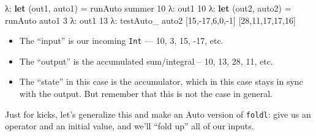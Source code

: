 \documentclass[]{article}
\newenvironment{Shaded}{}{}
\newcommand{\KeywordTok}[1]{\textcolor[rgb]{0.00,0.44,0.13}{\textbf{{#1}}}}
\newcommand{\DataTypeTok}[1]{\textcolor[rgb]{0.56,0.13,0.00}{{#1}}}
\newcommand{\DecValTok}[1]{\textcolor[rgb]{0.25,0.63,0.44}{{#1}}}
\newcommand{\OtherTok}[1]{\textcolor[rgb]{0.00,0.44,0.13}{{#1}}}
\newcommand{\FunctionTok}[1]{\textcolor[rgb]{0.02,0.16,0.49}{{#1}}}
\newcommand{\NormalTok}[1]{{#1}}
\begin{document}
\begin{Shaded}
\end{Shaded}

\begin{Shaded}
\begin{Highlighting}[]
\NormalTok{λ}\FunctionTok{:} \KeywordTok{let} \NormalTok{(out1, auto1) }\FunctionTok{=} \NormalTok{runAuto summer }\DecValTok{10}
\NormalTok{λ}\FunctionTok{:} \NormalTok{out1}
\DecValTok{10}
\NormalTok{λ}\FunctionTok{:} \KeywordTok{let} \NormalTok{(out2, auto2) }\FunctionTok{=} \NormalTok{runAuto auto1 }\DecValTok{3}
\NormalTok{λ}\FunctionTok{:} \NormalTok{out1}
\DecValTok{13}
\NormalTok{λ}\FunctionTok{:} \NormalTok{testAuto_ auto2 [}\DecValTok{15}\NormalTok{,}\FunctionTok{-}\DecValTok{17}\NormalTok{,}\DecValTok{6}\NormalTok{,}\DecValTok{0}\NormalTok{,}\FunctionTok{-}\DecValTok{1}\NormalTok{]}
\NormalTok{[}\DecValTok{28}\NormalTok{,}\DecValTok{11}\NormalTok{,}\DecValTok{17}\NormalTok{,}\DecValTok{17}\NormalTok{,}\DecValTok{16}\NormalTok{]}
\end{Highlighting}
\end{Shaded}

\begin{itemize}
\tightlist
\item
  The ``input'' is our incoming \texttt{Int} --- 10, 3, 15, -17, etc.
\item
  The ``output'' is the accumulated sum/integral -- 10, 13, 28, 11, etc.
\item
  The ``state'' in this case is the accumulator, which in this case
  stays in sync with the output. But remember that this is not the case
  in general.
\end{itemize}

Just for kicks, let's generalize this and make an Auto version of
\texttt{foldl}: give us an operator and an initial value, and we'll
``fold up'' all of our inputs.
\end{document}

